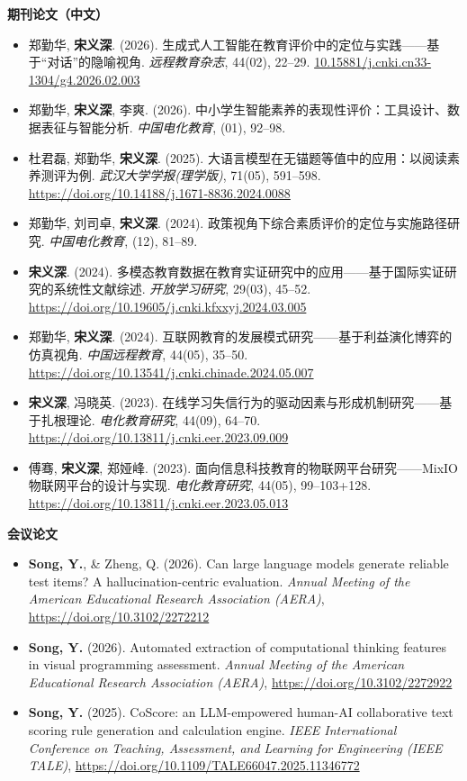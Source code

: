 \documentclass[a4paper,9pt]{extarticle}
\begin{document}
\noindent
\textbf{期刊论文（中文）}
\begin{itemize}
    \item 郑勤华, \textbf{宋义深}. (2026). 生成式人工智能在教育评价中的定位与实践——基于“对话”的隐喻视角. \textit{远程教育杂志}, 44(02), 22–29. \url{10.15881/j.cnki.cn33-1304/g4.2026.02.003}
    \item 郑勤华, \textbf{宋义深}, 李爽. (2026). 中小学生智能素养的表现性评价：工具设计、数据表征与智能分析. \textit{中国电化教育}, (01), 92–98.
    \item 杜君磊, 郑勤华, \textbf{宋义深}. (2025). 大语言模型在无锚题等值中的应用：以阅读素养测评为例. \textit{武汉大学学报(理学版)}, 71(05), 591–598. \url{https://doi.org/10.14188/j.1671-8836.2024.0088}
    \item 郑勤华, 刘司卓, \textbf{宋义深}. (2024). 政策视角下综合素质评价的定位与实施路径研究. \textit{中国电化教育}, (12), 81–89.
    \item \textbf{宋义深}. (2024). 多模态教育数据在教育实证研究中的应用——基于国际实证研究的系统性文献综述. \textit{开放学习研究}, 29(03), 45–52. \url{https://doi.org/10.19605/j.cnki.kfxxyj.2024.03.005}
    \item 郑勤华, \textbf{宋义深}. (2024). 互联网教育的发展模式研究——基于利益演化博弈的仿真视角. \textit{中国远程教育}, 44(05), 35–50. \url{https://doi.org/10.13541/j.cnki.chinade.2024.05.007}
    \item \textbf{宋义深}, 冯晓英. (2023). 在线学习失信行为的驱动因素与形成机制研究——基于扎根理论. \textit{电化教育研究}, 44(09), 64–70. \url{https://doi.org/10.13811/j.cnki.eer.2023.09.009}
    \item 傅骞, \textbf{宋义深}, 郑娅峰. (2023). 面向信息科技教育的物联网平台研究——MixIO物联网平台的设计与实现. \textit{电化教育研究}, 44(05), 99–103+128. \url{https://doi.org/10.13811/j.cnki.eer.2023.05.013}
\end{itemize}

\noindent
\textbf{会议论文}
\begin{itemize}
    \item \textbf{Song, Y.}, \& Zheng, Q. (2026). Can large language models generate reliable test items? A hallucination-centric evaluation. \textit{Annual Meeting of the American Educational Research Association (AERA)}, \url{https://doi.org/10.3102/2272212}
    \item \textbf{Song, Y.} (2026). Automated extraction of computational thinking features in visual programming assessment. \textit{Annual Meeting of the American Educational Research Association (AERA)}, \url{https://doi.org/10.3102/2272922}
    \item \textbf{Song, Y.} (2025). CoScore: an LLM-empowered human-AI collaborative text scoring rule generation and calculation engine. \textit{IEEE International Conference on Teaching, Assessment, and Learning for Engineering (IEEE TALE)}, \url{https://doi.org/10.1109/TALE66047.2025.11346772}
\end{itemize}
\end{document}
